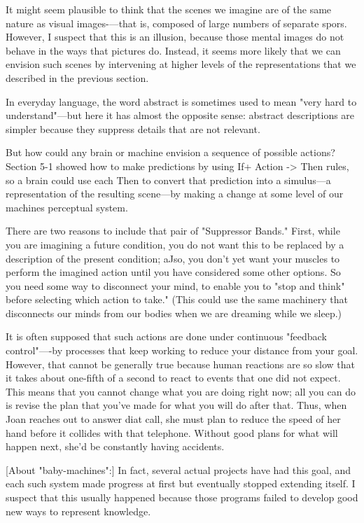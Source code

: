 \documentclass[10pt,a4paper]{article}
\begin{document}
It might seem plausible to think that the scenes we imagine are of the same nature as visual images-—that is, composed of large numbers of separate spors. However, I suspect that this is an illusion, because those mental images do not behave in the ways that pictures do. Instead, it seems more likely that we can envision such scenes by intervening at higher levels of the representations that we described in the previous section. \cite[p.~155]{minsky}

In everyday language, the word abstract is sometimes used to mean "very hard to understand"—but here it has almost the opposite sense: abstract descriptions are simpler because they suppress details that are not relevant. \cite[p.~157]{minsky}

But how could any brain or machine envision a sequence of possible actions? Section 5-1 showed how to make predictions by using If+ Action -> Then rules, so a brain could use each Then to convert that prediction into a simulus—a representation of the resulting scene—by making a change at some level of our machines perceptual system. \cite[p.~159]{minsky}

There are two reasons to include that pair of "Suppressor Bands." First, while you are imagining a future condition, you do not want this to be replaced by a description of the present condition; aJso, you don't yet want your muscles to perform the imagined action until you have considered some other options. So you need some way to disconnect your mind, to enable you to "stop and think" before selecting which action to take." (This could use the same machinery that disconnects our minds from our bodies when we are dreaming while we sleep.) \cite[p.~159-160]{minsky}

It is often supposed that such actions are done under continuous "feedback control"—-by processes that keep working to reduce your distance from your goal. However, that cannot be generally true because human reactions are so slow that it takes about one-fifth of a second to react to events that one did not expect. This means that you cannot change what you are doing right now; all you can do is revise the plan that you've made for what you will do after that. Thus, when Joan reaches out to answer diat call, she must plan to reduce the speed of her hand before it collides with that telephone. Without good plans for what will happen next, she'd be constantly having accidents. \cite[p.~173]{minsky}

[About "baby-machines":] In fact, several actual projects have had this goal, and each such system made progress at first but eventually stopped extending itself. I suspect that this usually happened because those programs failed to develop good new ways to represent knowledge. \cite[p.~178]{minsky}
\end{document}

